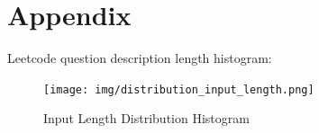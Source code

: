 \documentclass{article}
\begin{document}
%
%


\appendix

\section{Appendix}

Leetcode question description length histogram:
\begin{figure}[h!]
    \centering
    \texttt{[image: img/distribution\_input\_length.png]}
    \caption{Input Length Distribution Histogram}
    \label{fig:len_hist}
\end{figure}
\end{document}
